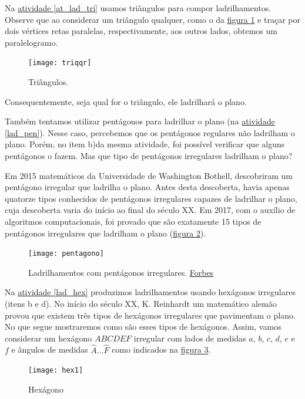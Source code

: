 Na \hyperref[at_lad_tri]{atividade \ref{at_lad_tri}} usamos triângulos para compor ladrilhamentos. Observe que ao considerar um triângulo qualquer, como o da \hyperref[triqqr]{figura \ref{triqqr}} e traçar por dois vértices retas paralelas, respectivamente, aos outros lados, obtemos um paralelogramo. 

\begin{figure}[H]
\centering
\texttt{[image: triqqr]}
\caption{Triângulos.}
\label{triqqr}
\end{figure}

Consequentemente, seja qual for o triângulo, ele ladrilhará o plano.

Também tentamos utilizar pentágonos para ladrilhar o plano (na \hyperref[lad_pen]{atividade \ref{lad_pen}}). Nesse caso, percebemos que os pentágonos regulares não ladrilham o plano. Porém, no item b)da mesma atividade, foi possível verificar  que alguns pentágonos o fazem. Mas que tipo de pentágonos irregulares ladrilham o plano?

Em 2015 matemáticos da  Universidade de Washington Bothell, descobriram um pentágono irregular que ladrilha o plano. Antes desta descoberta, havia apenas quatorze tipos conhecidos de pentágonos irregulares capazes de ladrilhar o  plano, cuja descoberta varia do início ao final do século XX. Em 2017, com o auxílio de algoritmos computacionais, foi provado que são exatamente 15 tipos de pentágonos irregulares que ladrilham o plano (\hyperref[pentagono]{figura \ref{pentagono}}).

\begin{figure}[H]
\centering
\texttt{[image: pentagono]}
\caption{Ladrilhamentos com pentágonos irregulares. \href{encurtador.com.br/dmuE3}{Forbes}}
\label{pentagono}
\end{figure}



Na \hyperref[lad_hex]{atividade \ref{lad_hex}} produzimos ladrilhamentos usando hexágonos irregulares (itens b e d). No início do século XX, K. Reinhardt um matemático alemão provou que existem três tipos de hexágonos irregulares que pavimentam o plano. No que segue mostraremos como são esses tipos de hexágonos. Assim, vamos considerar um hexágono $ABCDEF$ irregular com lados de medidas $a$, $b$, $c$, $d$, $e$ e $f$ e ângulos de medidas $\hat{A}... \hat{F}$ como indicados na \hyperref[hex1]{figura \ref{hex1}}.

\begin{figure}[H]
\centering
\texttt{[image: hex1]}
\caption{Hexágono}
\label{hex1}
\end{figure}

